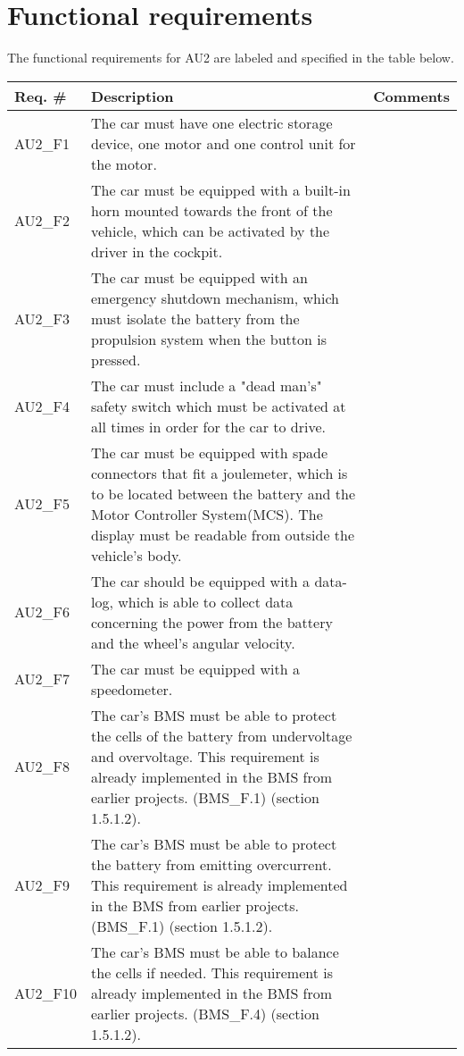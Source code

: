 \section{Functional requirements}
The functional requirements for AU2 are labeled and specified in the table below.

\begin{longtable}{|p{2 cm}|p{7 cm}|p{4 cm}|}
		\hline
		\textbf{Req. \#} & \textbf{Description} & \textbf{Comments} \\\hline
		AU2\_F1		& The car must have one electric storage device, one motor and one control unit for the motor. &   \\\hline
		AU2\_F2		& The car must be equipped with a built-in horn mounted towards the front of the vehicle, which can be activated by the driver in the cockpit. &   \\\hline
		AU2\_F3		& The car must be equipped with an emergency shutdown mechanism, which must isolate the battery from the propulsion system when the button is pressed. &   \\\hline
		AU2\_F4		& The car must include a "dead man's" safety switch which must be activated at all times in order for the car to drive. &   \\\hline
		AU2\_F5	& The car must be equipped with spade connectors that fit a joulemeter, which is to be located between the battery and the Motor Controller System(MCS). The display must be readable from outside the vehicle's body. &   \\\hline
		AU2\_F6	& The car should be equipped with a data-log, which is able to collect data concerning the power from the battery and the wheel's angular velocity. &   \\\hline
		AU2\_F7	& The car must be equipped with a speedometer. &   \\\hline
		AU2\_F8	& The car's BMS must be able to protect the cells of the battery from undervoltage and overvoltage. This requirement is already implemented in the BMS from earlier projects. (BMS\_F.1)\cite{BMSDocumentation} (section 1.5.1.2). &   \\\hline
		AU2\_F9	& The car's BMS must be able to protect the battery from emitting overcurrent. This requirement is already implemented in the BMS from earlier projects. (BMS\_F.1)\cite{BMSDocumentation} (section 1.5.1.2). &   \\\hline
		AU2\_F10	& The car's BMS must be able to balance the cells if needed. This requirement is already implemented in the BMS from earlier projects. (BMS\_F.4)\cite{BMSDocumentation} (section 1.5.1.2). &   \\\hline

\end{longtable}
